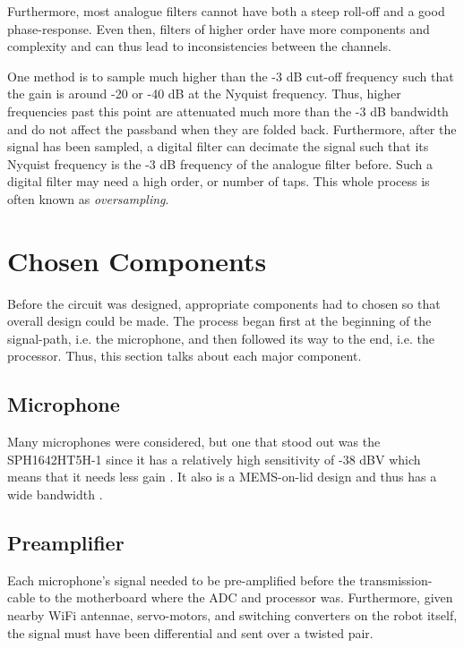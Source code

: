 \documentclass[notitlepage]{report}
\begin{document}
Furthermore, most analogue filters cannot have both a steep roll-off and a good phase-response. Even then, filters of higher order have more components and complexity and can thus lead to inconsistencies between the channels.

One method is to sample much higher than the -3 \si{dB} cut-off frequency such that the gain is around -20 or -40 \si{dB} at the Nyquist frequency\cite{horowitz_1351_2015}. Thus, higher frequencies past this point are attenuated much more than the -3 \si{dB} bandwidth and do not affect the passband when they are folded back. Furthermore, after the signal has been sampled, a digital filter can decimate the signal such that its Nyquist frequency is the -3 \si{dB} frequency of the analogue filter before. Such a digital filter may need a high order, or number of taps. This whole process is often known as \textit{oversampling}.

\section{Chosen Components}

Before the circuit was designed, appropriate components had to chosen so that overall design could be made. The process began first at the beginning of the signal-path, i.e. the microphone, and then followed its way to the end, i.e. the processor. Thus, this section talks about each major component.

\subsection{Microphone}

Many microphones were considered, but one that stood out was the SPH1642HT5H-1 since it has a relatively high sensitivity of -38 \si{dBV} which means that it needs less gain \cite{noauthor_sph1642ht5h-1_2017}. It also is a MEMS-on-lid design and thus has a wide bandwidth \cite{noauthor_sisonic_nodate}.

\subsection{Preamplifier}

Each microphone's signal needed to be pre-amplified before the transmission-cable to the motherboard where the ADC and processor was. Furthermore, given nearby WiFi antennae, servo-motors, and switching converters on the robot itself, the signal must have been differential and sent over a twisted pair.
\end{document}
